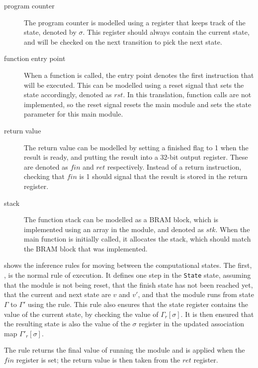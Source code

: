 \begin{description}
\item[program counter] The program counter is modelled using a register that
  keeps track of the state, denoted by $\sigma$.  This register should always
  contain the current state, and will be checked on the next transition to pick
  the next state.
\item[function entry point] When a function is called, the entry point denotes
  the first instruction that will be executed. This can be modelled using a
  reset signal that sets the state accordingly, denoted as $\mathit{rst}$.  In
  this translation, function calls are not implemented, so the reset signal
  resets the main module and sets the state parameter for this main module.
\item[return value] The return value can be modelled by setting a finished flag
  to 1 when the result is ready, and putting the result into a 32-bit output
  register. These are denoted as $\mathit{fin}$ and $\mathit{ret}$ respectively.
  Instead of a return instruction, checking that $\mathit{fin}$ is 1 should
  signal that the result is stored in the return register.
\item[stack] The function stack can be modelled as a \gls{BRAM} block, which is
  implemented using an array in the module, and denoted as $\mathit{stk}$.
  When the main function is initially called, it allocates the stack, which
  should match the \gls{BRAM} block that was implemented.
\end{description}

 shows the inference rules for moving between the
computational states.  The first, , is the normal rule
of execution.  It defines one step in the \texttt{State} state, assuming that
the module is not being reset, that the finish state has not been reached yet,
that the current and next state are $v$ and $v'$, and that the module runs from
state $\Gamma$ to $\Gamma'$ using the  rule.  This rule
also ensures that the state register contains the value of the current state, by
checking the value of $\Gamma_r[\sigma]$.  It is then ensured that the resulting
state is also the value of the $\sigma$ register in the updated association map
$\Gamma'_r[\sigma]$.

The  rule returns the final value of running the
module and is applied when the $\mathit{fin}$ register is set; the return value
is then taken from the $\mathit{ret}$ register.

